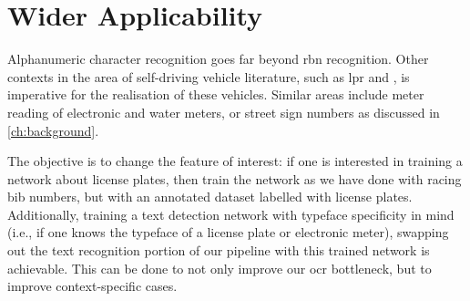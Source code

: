 \section{Wider Applicability}

Alphanumeric character recognition goes far beyond \gls{rbn} recognition. Other contexts in the area of self-driving vehicle literature, such as \gls{lpr} and , is imperative for the realisation of these vehicles. Similar areas include meter reading of electronic and water meters, or street sign numbers as discussed in \cref{ch:background}. 

The objective is to change the feature of interest: if one is interested in training a network about license plates, then train the network as we have done with racing bib numbers, but with an annotated dataset labelled with license plates. Additionally, training a text detection network with typeface specificity in mind (i.e., if one knows the typeface of a license plate or electronic meter), swapping out the text recognition portion of our pipeline with this trained network is achievable. This can be done to not only improve our \gls{ocr} bottleneck, but to improve context-specific cases.



